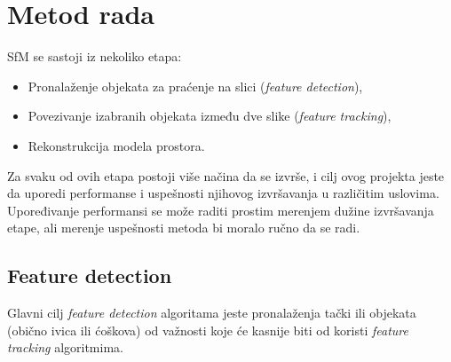 \documentclass{article}
\begin{document}
\section{Metod rada}
    SfM se sastoji iz nekoliko etapa:
    \begin{itemize}
        \item Pronalaženje objekata za praćenje na slici (\textit{feature detection}),
        \item Povezivanje izabranih objekata između dve slike (\textit{feature tracking}),
        \item Rekonstrukcija modela prostora.
    \end{itemize}
    Za svaku od ovih etapa postoji više načina da se izvrše, i cilj ovog projekta jeste da uporedi performanse i uspešnosti njihovog izvršavanja u različitim uslovima. Upoređivanje performansi se može raditi prostim merenjem dužine izvršavanja etape, ali merenje uspešnosti metoda bi moralo ručno da se radi.


    \subsection{Feature detection}
        Glavni cilj \textit{feature detection} algoritama jeste pronalaženja tački ili objekata (obično ivica ili ćoškova) od važnosti koje će kasnije biti od koristi \textit{feature tracking} algoritmima.
\end{document}
